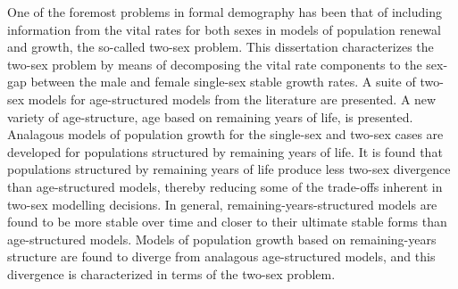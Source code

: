 
One of the foremost problems in formal demography has been that of including
information from the vital rates for both sexes in models of population renewal
and growth, the so-called two-sex problem. This dissertation
characterizes the two-sex problem by means of decomposing the vital rate
components to the sex-gap between the male and female single-sex stable growth
rates. A suite of two-sex models for age-structured models from the
literature are presented. A new variety of age-structure, age based on remaining
years of life, is presented. Analagous models of population growth for the
single-sex and two-sex cases are developed for populations structured by
remaining years of life. It is found that populations structured by remaining
years of life produce less two-sex divergence than age-structured models,
thereby reducing some of the trade-offs inherent in two-sex modelling decisions.
In general, remaining-years-structured models are found to be more stable over 
time and closer to their ultimate stable forms than age-structured models. Models of
population growth based on remaining-years structure are found to diverge from
analagous age-structured models, and this divergence is characterized in terms
of the two-sex problem.
